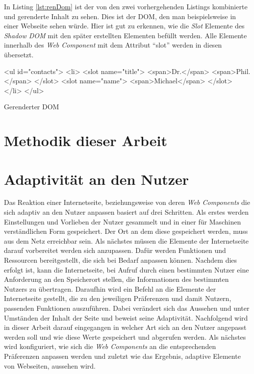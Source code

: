\documentclass[12pt, paper=a4, bibtotoc, toc=listof, headsepline=true]{scrreprt}
\begin{document}
			In Listing \ref{lst:renDom} ist der von den zwei vorhergehenden Listings kombinierte und gerenderte Inhalt zu sehen. Dies ist der \ac{DOM}, den man beispielsweise in einer Webseite sehen würde. Hier ist gut zu erkennen, wie die \emph{Slot} Elemente des \emph{Shadow \ac{DOM}} mit den später erstellten Elementen befüllt werden. Alle Elemente innerhalb des \emph{Web Component} mit dem Attribut \enquote{slot} werden in diesen übersetzt.
			\begin{listing}
				\begin{HTMLcode*}{}
<ul id="contacts">
   <li>
      <slot name="title">
	     <span>Dr.</span>
	     <span>Phil.</span>
	  </slot>
      <slot name="name">
	     <span>Michael</span>
      </slot>
   </li>
</ul>
				\end{HTMLcode*}
				\caption{Gerenderter DOM}
				\label{lst:renDom}
			\end{listing}
		
\chapter{Methodik dieser Arbeit}
\chapter{Adaptivität an den Nutzer}
Das Reaktion einer Internetseite, beziehungsweise von deren \emph{Web Components} die sich adaptiv an den Nutzer anpassen basiert auf drei Schritten. Als erstes werden Einstellungen und Vorlieben der Nutzer gesammelt und in einer für Maschinen verständlichen Form gespeichert. Der Ort an dem diese gespeichert werden, muss aus dem Netz erreichbar sein. Als nächstes müssen die Elemente der Internetseite darauf vorbereitet werden sich anzupassen. Dafür werden Funktionen und Ressourcen bereitgestellt, die sich bei Bedarf anpassen können. Nachdem dies erfolgt ist, kann die Internetseite, bei Aufruf durch einen bestimmten Nutzer eine Anforderung an den Speicherort stellen, die Informationen des bestimmten Nutzers zu übertragen. Daraufhin wird ein Befehl an die Elemente der Internetseite gestellt, die zu den jeweiligen Präferenzen und damit Nutzern, passenden Funktionen auszuführen. Dabei verändert sich das Aussehen und unter Umständen der Inhalt der Seite und beweist seine Adaptivität. \newline
Nachfolgend wird in dieser Arbeit darauf eingegangen in welcher Art sich an den Nutzer angepasst werden soll und wie diese Werte gespeichert und abgerufen werden. Als nächstes wird konfiguriert, wie sich die \emph{Web Components} an die entsprechenden Präferenzen anpassen werden und zuletzt wie das Ergebnis, adaptive Elemente von Webseiten, aussehen wird.
\end{document}
